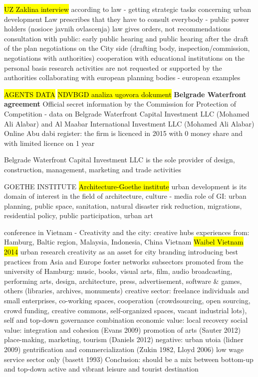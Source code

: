 \documentclass[11pt]{report}
\begin{document}
\hl{UZ Zaklina interview}
according to law - getting strategic tasks concerning urban development
Law prescribes that they have to consult everybody - public power holders (nosioce javnih ovlascenja)
law gives orders, not recommendations
consultation with public: early public hearing and public hearing after the draft of the plan 
negotiations on the City side (drafting body, inspection/commission, negotiations with authorities)
cooperation with educational institutions on the personal basis
research activities are not requested or supported by the authorities
collaborating with european planning bodies - european examples

\hl{AGENTS DATA}
\hl{NDVBGD analiza ugovora dokument}
\textbf{Belgrade Waterfront agreement}
Official secret information by the Commission for Protection of Competition - data on 
Belgrade Waterfront Capital Investment LLC (Mohamed Ali Alabar) and
Al Maabar International Investment LLC (Mohamed Ali Alabar)
Online Abu dabi register: the firm is licenced in 2015 with 0 money share and with limited licence on 1 year 

Belgrade Waterfront Capital Investment LLC is the sole provider of design, construction, management, marketing and trade activities

GOETHE INSTITUTE
\hl{Architecture-Goethe institute}
urban development is its domain of interest in the field of architecture, culture - media role of GI: urban planning, public space, sanitation, natural disaster risk reduction, migrations, residential policy, public participation, urban art

conference in Vietnam - Creativity and the city:
creative hubs
experiences from: Hamburg, Baltic region, Malaysia, Indonesia, China Vietnam
\hl{Waibel Vietnam 2014}
urban research
creativity as an asset for city branding
introducing best practices from Asia and Europe
foster networks
subsectors promoted from the university of Hamburg: music, books, visual arts, film, audio broadcasting, performing arts, design, architecture, press, advertisement, software \& games, others (libraries, archives, monuments)
creative sector: freelance individuals and small enterprises, co-working spaces, cooperation (crowdsourcing, open sourcing, crowd funding, creative commons, self-organized spaces, vacant industrial lots), self and top-down governance combination
economic value: local recovery
social value: integration and cohesion (Evans 2009)
promotion of arts (Sauter 2012)
place-making, marketing, tourism (Daniels 2012)
negative:
urban utoia (lidner 2009)
gentrification and commercialization (Zukin 1982, Lloyd 2006)
low wage service sector only (basett 1993)
Conclusion:
should be a mix between bottom-up and top-down
active and vibrant leisure and tourist destination
\end{document}
